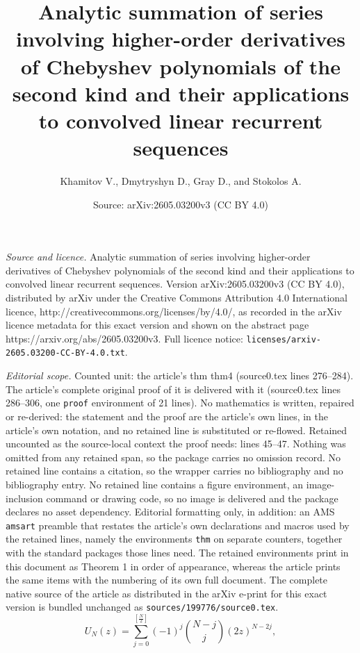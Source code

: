 \documentclass[10pt,a4paper]{amsart}
\title{Analytic summation of series involving higher-order derivatives of Chebyshev polynomials of the second kind and their applications to convolved linear recurrent sequences}
\author{Khamitov V., Dmytryshyn D., Gray D., and Stokolos A.}
\date{Source: arXiv:2605.03200v3 (CC BY 4.0)}
\begin{document}
\maketitle

\noindent\emph{Source and licence.} Analytic summation of series involving higher-order derivatives of Chebyshev polynomials of the second kind and their applications to convolved linear recurrent sequences. Version arXiv:2605.03200v3 (CC BY 4.0), distributed by arXiv under the Creative Commons Attribution 4.0 International licence, http://creativecommons.org/licenses/by/4.0/, as recorded in the arXiv licence metadata for this exact version and shown on the abstract page https://arxiv.org/abs/2605.03200v3. Full licence notice: \texttt{licenses/arxiv-2605.03200-CC-BY-4.0.txt}.\par\smallskip

\noindent\textit{Editorial scope.} Counted unit: the article's thm thm4 (source0.tex lines 276--284). The article's complete original proof of it is delivered with it (source0.tex lines 286--306, one \texttt{proof} environment of 21 lines). No mathematics is written, repaired or re-derived: the statement and the proof are the article's own lines, in the article's own notation, and no retained line is substituted or re-flowed.  Retained uncounted as the source-local context the proof needs: lines 45--47.  Nothing was omitted from any retained span, so the package carries no omission record.  No retained line contains a citation, so the wrapper carries no bibliography and no bibliography entry.  No retained line contains a figure environment, an image-inclusion command or drawing code, so no image is delivered and the package declares no asset dependency.  Editorial formatting only, in addition: an AMS \texttt{amsart} preamble that restates the article's own declarations and macros used by the retained lines, namely the environments \texttt{thm} on separate counters, together with the standard packages those lines need.  The retained environments print in this document as Theorem 1 in order of appearance, whereas the article prints the same items with the numbering of its own full document.  The complete native source of the article as distributed in the arXiv e-print for this exact version is bundled unchanged as \texttt{sources/199776/source0.tex}.
\begin{equation}\label{eq1}
U_N(z) = \sum_{j = 0}^{\left[\frac{N}{2}\right]}(-1)^j{N - j \choose j}(2z)^{N - 2j},
\end{equation}
\end{document}
